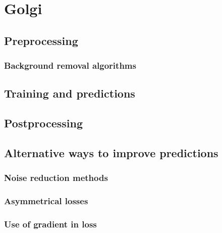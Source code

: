 \section{Golgi}
    \subsection{Preprocessing}
        
        \subsubsection{Background removal algorithms}
        
    \subsection{Training and predictions}
        
        

    \subsection{Postprocessing}
    \subsection{Alternative ways to improve predictions}
        \subsubsection{Noise reduction methods}
        \subsubsection{Asymmetrical losses}
        \subsubsection{Use of gradient in loss}
